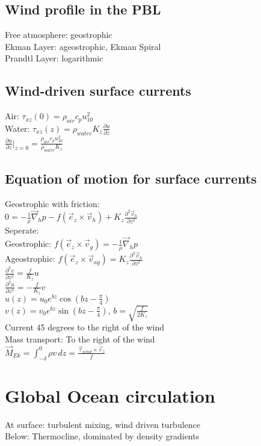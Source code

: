 \subsection*{Wind profile in the PBL}
Free atmosphere: geostrophic\\
Ekman Layer: ageostrophic, Ekman Spiral\\
Prandtl Layer: logarithmic
\subsection*{Wind-driven surface currents}
Air: $\tau_{xz}(0)=\rho_{air}c_p u_{10}^2$\\
Water: $\tau_{xz}(z)=\rho_{water}K_z\frac{\partial u}{\partial z}$\\
$\frac{\partial u}{\partial z}\big|_{z=0}=\frac{\rho_{air}c_p u_{10}^2}{\rho_{water}K_z}$\\
\subsection*{Equation of motion for surface currents}
Geostrophic with friction:\\
$0=-\frac{1}{\rho}\vec{\nabla}_hp-f(\vec{e}_z\times\vec{v}_h)+K_z\frac{\partial^2\vec{v}_h}{\partial z^2}$\\
Seperate:\\
Geostrophic: $f(\vec{e}_z\times\vec{v}_g)=-\frac{1}{\rho}\vec{\nabla}_hp$\\
Ageostrophic: $f(\vec{e}_z\times\vec{v}_{ag})=K_z\frac{\partial^2 \vec{v}_h}{\partial z^2}$\\
$\frac{\partial^2 v}{\partial z^2}=\frac{f}{K_z}u$\\
$\frac{\partial^2 u}{\partial z^2}=-\frac{f}{K_z}v$\\
$u(z)=u_{0}e^{bz}\cos{(bz-\frac{\pi}{4})}$\\
$v(z)=v_{0}e^{bz}\sin{(bz-\frac{\pi}{4})}$, $b=\sqrt{\frac{f}{2K_z}}$\\
Current 45 degrees to the right of the wind\\
Mass transport: To the right of the wind\\
$\vec{M}_{Ek}=\int_{-\delta}^0\rho v\,dz=\frac{\vec{\tau}_{wind}\times\vec{e}_z}{f}$
\section*{Global Ocean circulation}
At surface: turbulent mixing, wind driven turbulence\\
Below: Thermocline, dominated by density gradients
